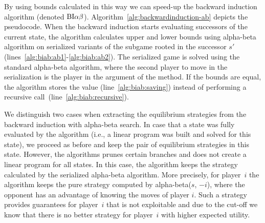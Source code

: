 By using bounds calculated in this way we can speed-up the backward induction algorithm (denoted $\textrm{BI}\alpha\beta$). 
Algorithm~\ref{alg:backwardinduction-ab} depicts the pseudocode.
When the backward induction starts evaluating successors of the current state, the algorithm calculates upper and lower bounds using alpha-beta algorithm on serialized variants of the subgame rooted in the successor $s'$ (lines~\ref{alg:biab:ab1}-\ref{alg:biab:ab2}). 
The serialized game is solved using the standard alpha-beta algorithm, where the second player to move in the serialization is the player in the argument of the method.
If the bounds are equal, the algorithm stores the value (line~\ref{alg:biab:saving}) instead of performing a recursive call~(line~\ref{alg:biab:recursive}). 

We distinguish two cases when extracting the equilibrium strategies from the backward induction with alpha-beta search.
In case that a state was fully evaluated by the algorithm (i.e., a linear program was built and solved for this state), we proceed as before and keep the pair of equilibrium strategies in this state.
However, the algorithms prunes certain branches and does not create a linear program for all states.
In this case, the algorithm keeps the strategy calculated by the serialized alpha-beta algorithm.
More precisely, for player~$i$ the algorithm keeps the pure strategy computed by alpha-beta($s$, $-i$), where the opponent has an advantage of knowing the moves of player $i$. 
Such a strategy provides guarantees for player~$i$ that is not exploitable and due to the cut-off we know that there is no better strategy for player~$i$ with higher expected utility.

